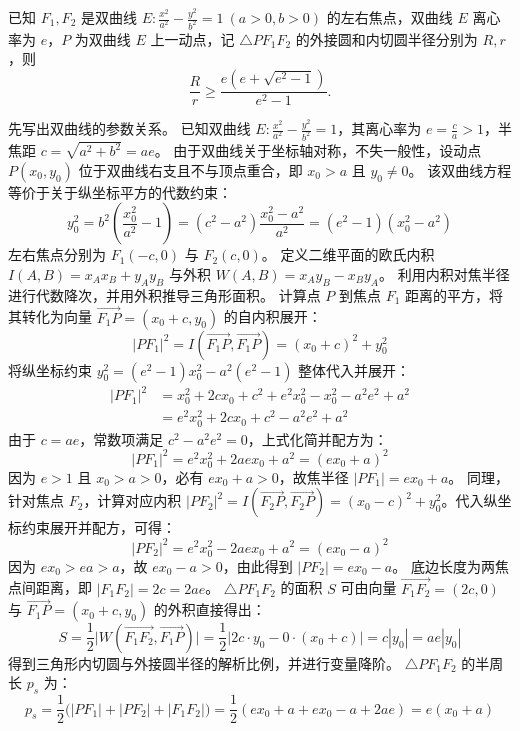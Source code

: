 \begin{example}
已知 \(F_1,F_2\) 是双曲线 \(E: \frac{x^2}{a^2} - \frac{y^2}{b^2} = 1\ (a>0,b>0)\) 的左右焦点，双曲线 \(E\) 离心率为 \(e\)，\(P\) 为双曲线 \(E\) 上一动点，记 \(\triangle PF_1F_2\) 的外接圆和内切圆半径分别为 \(R,r\)，则
\[
\frac{R}{r} \ge \frac{e(e+\sqrt{e^2-1})}{e^2-1}.
\]
\end{example}
\begin{solution}
先写出双曲线的参数关系。
已知双曲线 $E: \frac{x^2}{a^2} - \frac{y^2}{b^2} = 1$，其离心率为 $e = \frac{c}{a} > 1$，半焦距 $c = \sqrt{a^2 + b^2} = ae$。
由于双曲线关于坐标轴对称，不失一般性，设动点 $P(x_0, y_0)$ 位于双曲线右支且不与顶点重合，即 $x_0 > a$ 且 $y_0 \neq 0$。
该双曲线方程等价于关于纵坐标平方的代数约束：
\[ y_0^2 = b^2 \left( \frac{x_0^2}{a^2} - 1 \right) = (c^2 - a^2) \frac{x_0^2 - a^2}{a^2} = (e^2 - 1)(x_0^2 - a^2) \]
左右焦点分别为 $F_1(-c, 0)$ 与 $F_2(c, 0)$。
定义二维平面的欧氏内积 $I(A, B) = x_A x_B + y_A y_B$ 与外积 $W(A, B) = x_A y_B - x_B y_A$。
利用内积对焦半径进行代数降次，并用外积推导三角形面积。
计算点 $P$ 到焦点 $F_1$ 距离的平方，将其转化为向量 $\overrightarrow{F_1P} = (x_0 + c, y_0)$ 的自内积展开：
\[ |PF_1|^2 = I(\overrightarrow{F_1P}, \overrightarrow{F_1P}) = (x_0 + c)^2 + y_0^2 \]
将纵坐标约束 $y_0^2 = (e^2 - 1)x_0^2 - a^2(e^2 - 1)$ 整体代入并展开：
\begin{align*}
|PF_1|^2 &= x_0^2 + 2cx_0 + c^2 + e^2 x_0^2 - x_0^2 - a^2 e^2 + a^2 \\
&= e^2 x_0^2 + 2cx_0 + c^2 - a^2 e^2 + a^2
\end{align*}
由于 $c = ae$，常数项满足 $c^2 - a^2 e^2 = 0$，上式化简并配方为：
\[ |PF_1|^2 = e^2 x_0^2 + 2aex_0 + a^2 = (ex_0 + a)^2 \]
因为 $e > 1$ 且 $x_0 > a > 0$，必有 $ex_0 + a > 0$，故焦半径 $|PF_1| = ex_0 + a$。
同理，针对焦点 $F_2$，计算对应内积 $|PF_2|^2 = I(\overrightarrow{F_2P}, \overrightarrow{F_2P}) = (x_0 - c)^2 + y_0^2$。代入纵坐标约束展开并配方，可得：
\[ |PF_2|^2 = e^2 x_0^2 - 2aex_0 + a^2 = (ex_0 - a)^2 \]
因为 $ex_0 > ea > a$，故 $ex_0 - a > 0$，由此得到 $|PF_2| = ex_0 - a$。
底边长度为两焦点间距离，即 $|F_1F_2| = 2c = 2ae$。
$\triangle PF_1F_2$ 的面积 $S$ 可由向量 $\overrightarrow{F_1F_2} = (2c, 0)$ 与 $\overrightarrow{F_1P} = (x_0 + c, y_0)$ 的外积直接得出：
\[ S = \frac{1}{2} \big| W(\overrightarrow{F_1F_2}, \overrightarrow{F_1P}) \big| = \frac{1}{2} \big| 2c \cdot y_0 - 0 \cdot (x_0 + c) \big| = c|y_0| = ae|y_0| \]
得到三角形内切圆与外接圆半径的解析比例，并进行变量降阶。
$\triangle PF_1F_2$ 的半周长 $p_s$ 为：
\[ p_s = \frac{1}{2} \big( |PF_1| + |PF_2| + |F_1F_2| \big) = \frac{1}{2} (ex_0 + a + ex_0 - a + 2ae) = e(x_0 + a) \]

\end{solution}
